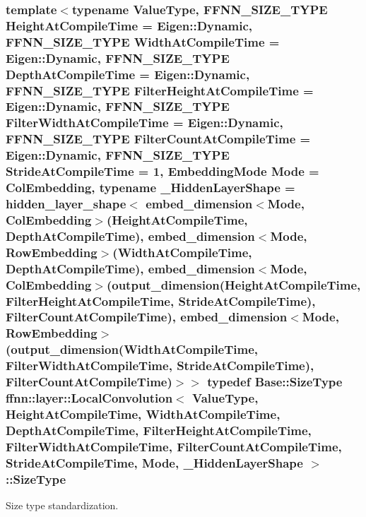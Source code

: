 \hypertarget{classffnn_1_1layer_1_1_local_convolution_acb63c6ee4ca498d7992259aaa7246f26}{
\subsubsection[{Size\-Type}]{\setlength{\rightskip}{0pt plus 5cm}template$<$typename Value\-Type, F\-F\-N\-N\-\_\-\-S\-I\-Z\-E\-\_\-\-T\-Y\-P\-E Height\-At\-Compile\-Time = Eigen\-::\-Dynamic, F\-F\-N\-N\-\_\-\-S\-I\-Z\-E\-\_\-\-T\-Y\-P\-E Width\-At\-Compile\-Time = Eigen\-::\-Dynamic, F\-F\-N\-N\-\_\-\-S\-I\-Z\-E\-\_\-\-T\-Y\-P\-E Depth\-At\-Compile\-Time = Eigen\-::\-Dynamic, F\-F\-N\-N\-\_\-\-S\-I\-Z\-E\-\_\-\-T\-Y\-P\-E Filter\-Height\-At\-Compile\-Time = Eigen\-::\-Dynamic, F\-F\-N\-N\-\_\-\-S\-I\-Z\-E\-\_\-\-T\-Y\-P\-E Filter\-Width\-At\-Compile\-Time = Eigen\-::\-Dynamic, F\-F\-N\-N\-\_\-\-S\-I\-Z\-E\-\_\-\-T\-Y\-P\-E Filter\-Count\-At\-Compile\-Time = Eigen\-::\-Dynamic, F\-F\-N\-N\-\_\-\-S\-I\-Z\-E\-\_\-\-T\-Y\-P\-E Stride\-At\-Compile\-Time = 1, Embedding\-Mode Mode = Col\-Embedding, typename \-\_\-\-Hidden\-Layer\-Shape = hidden\-\_\-layer\-\_\-shape$<$              embed\-\_\-dimension$<$\-Mode, Col\-Embedding$>$(\-Height\-At\-Compile\-Time, Depth\-At\-Compile\-Time),              embed\-\_\-dimension$<$\-Mode, Row\-Embedding$>$(\-Width\-At\-Compile\-Time,  Depth\-At\-Compile\-Time),              embed\-\_\-dimension$<$\-Mode, Col\-Embedding$>$(output\-\_\-dimension(\-Height\-At\-Compile\-Time, Filter\-Height\-At\-Compile\-Time, Stride\-At\-Compile\-Time), Filter\-Count\-At\-Compile\-Time),              embed\-\_\-dimension$<$\-Mode, Row\-Embedding$>$(output\-\_\-dimension(\-Width\-At\-Compile\-Time,  Filter\-Width\-At\-Compile\-Time,  Stride\-At\-Compile\-Time), Filter\-Count\-At\-Compile\-Time)$>$$>$ typedef {\bf Base\-::\-Size\-Type} {\bf ffnn\-::layer\-::\-Local\-Convolution}$<$ Value\-Type, Height\-At\-Compile\-Time, Width\-At\-Compile\-Time, Depth\-At\-Compile\-Time, Filter\-Height\-At\-Compile\-Time, Filter\-Width\-At\-Compile\-Time, Filter\-Count\-At\-Compile\-Time, Stride\-At\-Compile\-Time, Mode, \-\_\-\-Hidden\-Layer\-Shape $>$\-::{\bf Size\-Type}}}\label{classffnn_1_1layer_1_1_local_convolution_acb63c6ee4ca498d7992259aaa7246f26}


Size type standardization. 



